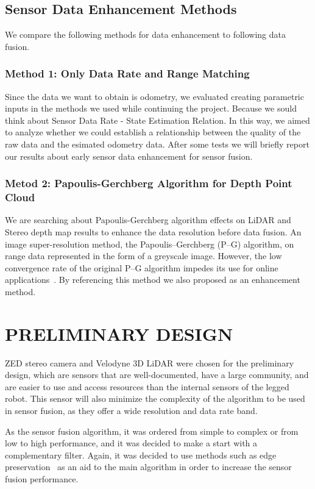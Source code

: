 \documentclass[12pt]{article}
\begin{document}
\subsection{Sensor Data Enhancement Methods}

We compare the following methods for data enhancement to following data fusion.

\subsubsection{Method 1: Only Data Rate and Range Matching}
Since the data we want to obtain is odometry, we evaluated creating parametric inputs in the methods we used while continuing the project. Because we sould think about Sensor Data Rate - State Estimation Relation. In this way, we aimed to analyze whether we could establish a relationship between the quality of the raw data and the esimated odometry data. After some tests we will briefly report our results about early sensor data enhancement for sensor fusion.

\subsubsection{Metod 2: Papoulis-Gerchberg Algorithm for Depth Point Cloud}
We are searching about Papoulis-Gerchberg algorithm effects on LiDAR and Stereo depth map results to enhance the data resolution before data fusion. An image super-resolution method, the Papoulis–Gerchberg (P–G) algorithm, on range data represented in the form of a greyscale image. However, the low convergence rate of the original P–G algorithm impedes its use for online applications~\cite{ozbay2015high, kuzucu2018enhancing}. By referencing this method we also proposed as an enhancement method.~\cite{6280128}


\section{PRELIMINARY DESIGN}

ZED stereo camera and Velodyne 3D LiDAR were chosen for the preliminary design, which are sensors that are well-documented, have a large community, and are easier to use and access resources than the internal sensors of the legged robot. This sensor will also minimize the complexity of the algorithm to be used in sensor fusion, as they offer a wide resolution and data rate band.

As the sensor fusion algorithm, it was ordered from simple to complex or from low to high performance, and it was decided to make a start with a complementary filter. Again, it was decided to use methods such as edge preservation~\cite{9307398} as an aid to the main algorithm in order to increase the sensor fusion performance.
\end{document}

